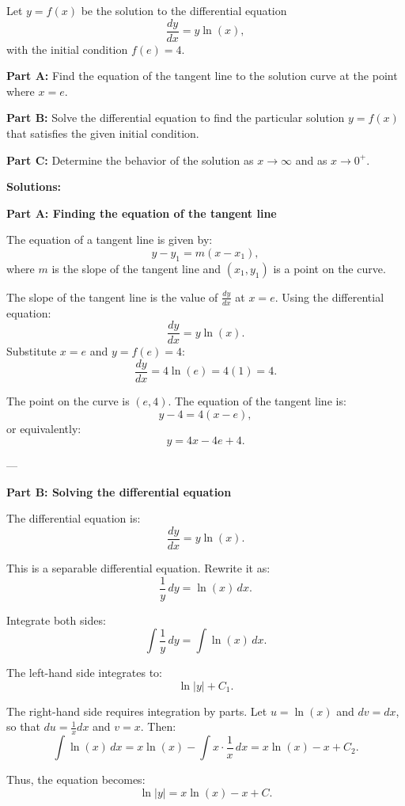 \documentclass{article}
\begin{document}
\newpage
\begin{tcolorbox}[colback=blue!10, colframe=blue!50!black, title=AP Calculus Problem]
Let \(y = f(x)\) be the solution to the differential equation
\[
\frac{dy}{dx} = y \ln(x),
\]
with the initial condition \(f(e) = 4\).

\textbf{Part A:} Find the equation of the tangent line to the solution curve at the point where \(x = e\).

\textbf{Part B:} Solve the differential equation to find the particular solution \(y = f(x)\) that satisfies the given initial condition.

\textbf{Part C:} Determine the behavior of the solution as \(x \to \infty\) and as \(x \to 0^+\).
\end{tcolorbox}

\textbf{Solutions:}

\textbf{Part A: Finding the equation of the tangent line}

The equation of a tangent line is given by:
\[
y - y_1 = m(x - x_1),
\]
where \(m\) is the slope of the tangent line and \((x_1, y_1)\) is a point on the curve.

The slope of the tangent line is the value of \(\frac{dy}{dx}\) at \(x = e\). Using the differential equation:
\[
\frac{dy}{dx} = y \ln(x).
\]
Substitute \(x = e\) and \(y = f(e) = 4\):
\[
\frac{dy}{dx} = 4 \ln(e) = 4(1) = 4.
\]

The point on the curve is \((e, 4)\). The equation of the tangent line is:
\[
y - 4 = 4(x - e),
\]
or equivalently:
\[
y = 4x - 4e + 4.
\]

---

\textbf{Part B: Solving the differential equation}

The differential equation is:
\[
\frac{dy}{dx} = y \ln(x).
\]

This is a separable differential equation. Rewrite it as:
\[
\frac{1}{y} \, dy = \ln(x) \, dx.
\]

Integrate both sides:
\[
\int \frac{1}{y} \, dy = \int \ln(x) \, dx.
\]

The left-hand side integrates to:
\[
\ln|y| + C_1.
\]

The right-hand side requires integration by parts. Let \(u = \ln(x)\) and \(dv = dx\), so that \(du = \frac{1}{x} dx\) and \(v = x\). Then:
\[
\int \ln(x) \, dx = x \ln(x) - \int x \cdot \frac{1}{x} \, dx = x \ln(x) - x + C_2.
\]

Thus, the equation becomes:
\[
\ln|y| = x \ln(x) - x + C.
\]
\end{document}
